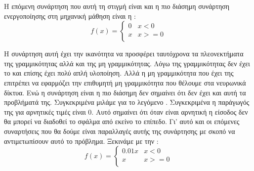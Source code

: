 Η επόμενη συνάρτηση που αυτή τη στιγμή είναι και η πιο διάσημη συνάρτηση ενεργοποίησης στη μηχανική μάθηση είναι η :
\[f(x)=\left\{\begin{array}{ll}0 & x<0 \\ x & x>=0 \\ \end{array} \right.\]
\begin{figure}[H]
    \centering
    \caption{}
\end{figure}
Η συνάρτηση αυτή έχει την ικανότητα να προσφέρει ταυτόχρονα τα πλεονεκτήματα της γραμμικότητας αλλά και της μη γραμμικότητας. Λόγω της γραμμικότητας δεν έχει το  και επίσης έχει πολύ απλή υλοποίηση. Αλλά η μη
γραμμικότητα που έχει της επιτρέπει να εφαρμόζει την επιθυμητή μη γραμμικότητα που θέλουμε στα νευρωνικά δίκτυα. Ενώ η συνάρτηση είναι η πιο διάσημη δεν σημαίνει ότι δεν έχει και αυτή τα προβλήματά της. Συγκεκριμένα μιλάμε για το λεγόμενο
. Συγκεκριμένα η παράγωγός της για αρνητικές τιμές είναι 0. Αυτό σημαίνει ότι όταν είναι αρνητική η είσοδος δεν θα μπορεί να διαδοθεί το σφάλμα από εκείνο το επίπεδο. Γι' αυτό και οι επόμενες συναρτήσεις που θα δούμε
είναι παραλλαγές αυτής της συνάρτησης με σκοπό να αντιμετωπίσουν αυτό το πρόβλημα. Ξεκινάμε με την :
\[f(x)=\left\{\begin{array}{ll}0.01x & x<0 \\ x & x>=0 \\ \end{array} \right.\]
\begin{figure}[H]
    \centering
    \caption{}
\end{figure}
